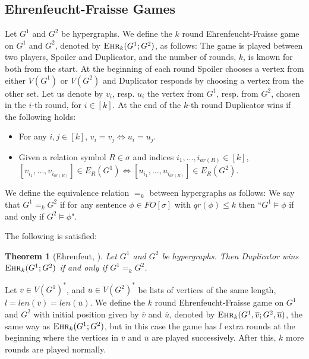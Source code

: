\documentclass[12pt,notitlepage,a4paper]{article}
\newtheorem{theorem}{Theorem}[section]
\theoremstyle{definition}
\newcommand{\ehr}{\textsc{Ehr}}
\begin{document}
\subsection{Ehrenfeucht-Fraisse Games}

Let $G^1$ and $G^2$ be hypergraphs. We define the $k$ round 
Ehrenfeucht-Fraisse game on $G^1$ and $G^2$, denoted by
$\ehr_k(G^1;G^2)$, as follows:
The game is played between two players, Spoiler and Duplicator, and
the number of rounds, $k$, is known for both from the start.
At the beginning of each round Spoiler chooses a vertex from either
$V(G^1)$ or $V(G^2)$ and Duplicator responds by choosing a vertex
from the other set.
Let us denote by 
$v_i$, resp. $u_i$ the vertex from $G^1$, resp. from $G^2$, 
chosen in the $i$-th round,
for $i\in [k]$. At the end of the $k$-th round 
Duplicator wins if the following holds:
\begin{itemize}
	\item For any $i,j\in [k]$, $v_i=v_j \iff u_i=u_j$.
	\item Given a relation symbol $R\in \sigma$ 
	and indices $i_1,\dots, i_{ar(R)} \in [k]$, 
	$[v_{i_1},\dots,v_{i_{ar(R)}}] \in E_R(G^1) \iff 
	[u_{i_1},\dots,u_{i_{ar(R)}}]
	\in E_R(G^2)$.
	
\end{itemize}


We define the equivalence relation $=_k$ between hypergraphs as follows:
We say that $G^1=_k G^2$ if for any sentence $\phi\in 
FO[\sigma]$ with $qr(\phi)\leq k$ then ``$G^1\models\phi$ if and 
only if $G^2\models\phi$". 
\par

The following is satisfied:

\begin{theorem}
	[Ehrenfeut, \citealp{ehrenfeucht1961application}] Let
	$G^1$ and $G^2$ be hypergraphs.
	Then Duplicator wins $\ehr_k(G^1;G^2)$
	if and only if $G^1=_k G^2$.	
\end{theorem}

Let $\overline{v}\in V(G^1)^*$, and 
$\overline{u}\in V(G^2)^*$ be lists of vertices of the same length, 
$l=len(\overline{v})=len(\overline{u})$. We define the $k$ round 
Ehrenfeucht-Fraisse game on $G^1$ and $G^2$ with initial position given
by $\overline{v}$ and $\overline{u}$, denoted by $\ehr_k(G^1,\overline{v};G^2,\overline{u})$,
the same way as $\ehr_k(G^1;G^2)$, but in this case the game has $l$ extra 
rounds at the beginning where the vertices in $\overline{v}$ and $\overline{u}$ are 
played successively. After this, $k$ more rounds are played normally. \par
\end{document}
